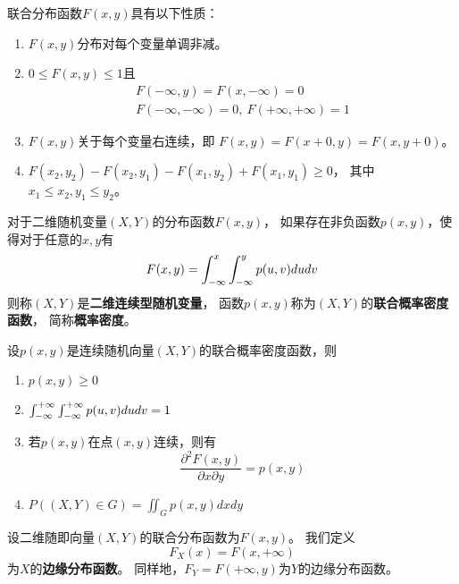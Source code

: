 \begin{theorem}[联合分布函数的性质]
  联合分布函数$F(x,y)$具有以下性质：
  \begin{enumerate}
    \item 
    $F(x,y)$分布对每个变量单调非减。
    \item 
    $0\le F(x,y)\le 1$且
    \begin{gather*}
    F(-\infty,y)=F(x,-\infty) = 0 \\
    F(-\infty,-\infty)=0,\ F(+\infty,+\infty)=1
    \end{gather*}
    \item 
    $F(x,y)$关于每个变量右连续，即
    $F(x,y)=F(x+0,y)=F(x,y+0)$。
    \item
    $F(x_2,y_2)-F(x_2,y_1)-F(x_1,y_2)+F(x_1,y_1)\ge 0$，
    其中$x_1\le x_2, y_1 \le y_2$。
  \end{enumerate}
\end{theorem}

\begin{definition}[二维连续型随机变量与联合概率密度函数]
  对于二维随机变量$(X,Y)$的分布函数$F(x,y)$，
  如果存在非负函数$p(x,y)$，使得对于任意的$x,y$有
  \begin{displaymath}
  F(x,y)=\int_{-\infty}^{x}\int_{-\infty}^{y}p(u,v)dudv
  \end{displaymath}
  则称$(X,Y)$是\textbf{二维连续型随机变量}，
  函数$p(x,y)$称为$(X,Y)$的\textbf{联合概率密度函数}，
  简称\textbf{概率密度}。
\end{definition}

\begin{theorem}[联合概率密度函数的性质]
  设$p(x,y)$是连续随机向量$(X,Y)$的联合概率密度函数，则
  \begin{enumerate}
    \item 
    $p(x,y)\ge 0$
    \item 
    $\int_{-\infty}^{+\infty}\int_{-\infty}^{+\infty} p(u,v)dudv = 1$
    \item 
    若$p(x,y)$在点$(x,y)$连续，则有
    \[ \frac{\partial^2 F(x,y)}{\partial x\partial y} = p(x,y) \]
    \item 
    $P\left((X,Y)\in G\right) = \iint_G p(x,y)dxdy$
  \end{enumerate}
\end{theorem}

\begin{definition}[边缘分布函数]
  设二维随即向量$(X,Y)$的联合分布函数为$F(x,y)$。
  我们定义
  \begin{displaymath}
    F_X(x)=F(x,+\infty)
  \end{displaymath}
  为$X$的\textbf{边缘分布函数}。
  同样地，$F_Y=F(+\infty,y)$为$Y$的边缘分布函数。
\end{definition}


